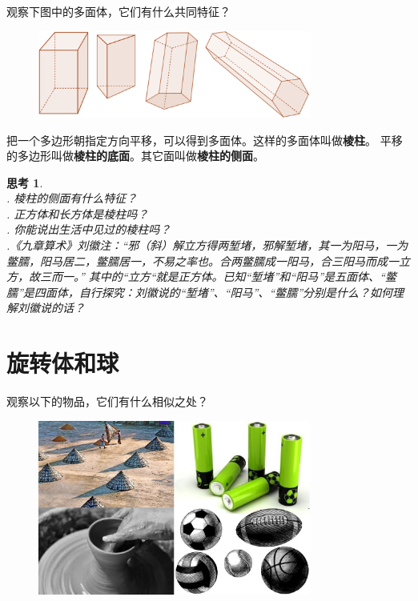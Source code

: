 \documentclass[12pt,UTF8]{ctexbook}
\newtheorem{sk}{思考}[section]
\begin{document}
观察下图中的多面体，它们有什么共同特征？

\begin{figure}[h] %
    \vspace{4pt}
    \centering
    \includegraphics[width=0.8\textwidth]{棱柱1.png}
\end{figure}

把一个多边形朝指定方向平移，可以得到多面体。这样的多面体叫做\textbf{棱柱}。
平移的多边形叫做\textbf{棱柱的底面}。其它面叫做\textbf{棱柱的侧面}。

\begin{sk}
    \mbox{}\\
    . 棱柱的侧面有什么特征？\\
    . 正方体和长方体是棱柱吗？\\
    . 你能说出生活中见过的棱柱吗？\\
    .《九章算术》刘徽注：“邪（斜）解立方得两堑堵，邪解堑堵，其一为阳马，一为鳖臑，阳马居二，鳖臑居一，不易之率也。合两鳖臑成一阳马，合三阳马而成一立方，故三而一。”
    其中的“立方“就是正方体。已知“堑堵”和“阳马”是五面体、“鳖臑”是四面体，自行探究：刘徽说的“堑堵”、“阳马”、“鳖臑”分别是什么？如何理解刘徽说的话？
\end{sk}

\section{旋转体和球}

观察以下的物品，它们有什么相似之处？

\begin{figure}[h] %
    \vspace{4pt}
    \centering
    \includegraphics[width=0.8\textwidth]{旋转体例1.jpg}
\end{figure}
\end{document}
